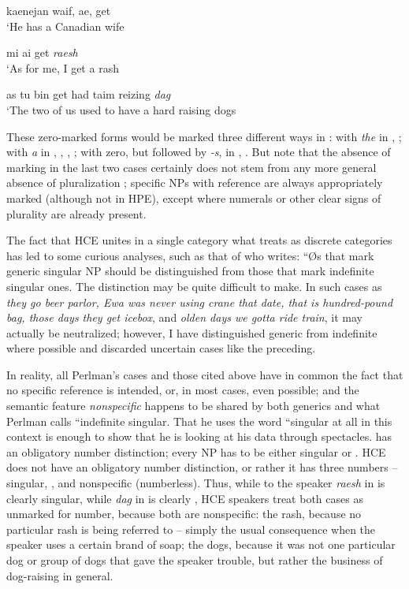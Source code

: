 \ea\label{ex:41}
kaenejan waif, ae, get \\
\glt `He has a Canadian wife
\glt 
\z

\ea\label{ex:42}
mi ai get \textit{raesh}\\
\glt `As for me, I get a rash
\z

\ea\label{ex:43}
as tu bin get had taim reizing \textit{dag}\\
\glt `The two of us used to have a hard  raising dogs
\z

These zero-marked forms would be marked three different ways in : with \textit{the} in , ; with \textit{a} in , , , ; with zero, but followed by  \textit{-s}, in , . But note that the absence of  marking in the last two cases certainly does not stem from any more general absence of pluralization ; specific NPs with  reference are always appropriately marked  (although not in HPE), except where numerals or other clear signs of plurality are already present.

The fact that HCE unites in a single category what  treats as discrete categories has led to some curious analyses, such as that of \citet[99]{Perlman1973} who writes: ``{\O}s that mark generic singular NP should be distinguished from those that mark indefinite singular ones. The distinction may be quite difficult to make. In such cases as \textit{they go beer parlor, Ewa was never using crane that date, that is hundred-pound bag, those days they get icebox}, and \textit{olden days we gotta ride train}, it may actually be neutralized; however, I have dis\-tinguished generic from indefinite where possible and discarded un\-certain cases like the preceding.{\textquotedbl}

In reality, all Perlman's cases and those cited above have in common the fact that no specific reference is intended, or, in most cases, even possible; and the semantic feature \textit{nonspecific} happens to be
shared by both generics and what Perlman calls ``indefinite singular. That he uses the word ``singular at all in this context is enough to show that he is looking at his data through  spectacles.  has an obligatory number distinction; every NP has to be either singular or . HCE does not have an obligatory number distinction, or rather it has three numbers -- singular, , and nonspecific (number\-less). Thus, while to the  speaker \textit{raesh} in  is clearly singular, while \textit{dag} in  is clearly , HCE speakers treat both cases as unmarked for number, because both are nonspecific: the rash, because no particular rash is being referred to -- simply the usual consequence when the speaker uses a certain brand of soap; the dogs, because it was not one particular dog or group of dogs that gave the speaker trouble, but rather the business of dog-raising in general.

